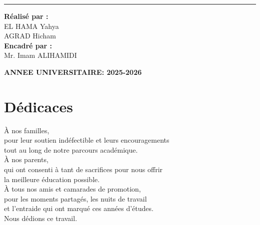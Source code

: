 \documentclass[12pt, a4paper]{report}
\begin{document}
\begin{titlepage}
  \begin{center}
    \noindent\rule{0.55\textwidth}{0.8pt}
  \end{center}

  \vspace{1.6cm}

  \noindent
  \begin{minipage}[t]{0.55\textwidth}
    \raggedright
    {\bfseries Réalisé par :}\\[0.3cm]
    EL HAMA Yahya\\[0.15cm]
    AGRAD Hicham\\[0.8cm]
    {\bfseries Encadré par :}\\[0.3cm]
    Mr. Imam ALIHAMIDI
  \end{minipage}

  \vfill

  \begin{center}
    {\normalsize\bfseries ANNEE UNIVERSITAIRE: 2025-2026}
  \end{center}

\end{titlepage}

\chapter*{Dédicaces}
\thispagestyle{empty}

\vspace*{2cm}

\begin{center}
  \itshape\large

  À nos familles,\\[0.5cm]
  pour leur soutien indéfectible et leurs encouragements\\
  tout au long de notre parcours académique.\\[1.5cm]

  À nos parents,\\[0.5cm]
  qui ont consenti à tant de sacrifices pour nous offrir\\
  la meilleure éducation possible.\\[1.5cm]

  À tous nos amis et camarades de promotion,\\[0.5cm]
  pour les moments partagés, les nuits de travail\\
  et l'entraide qui ont marqué ces années d'études.\\[1.5cm]

  Nous dédions ce travail.
\end{center}
\end{document}
